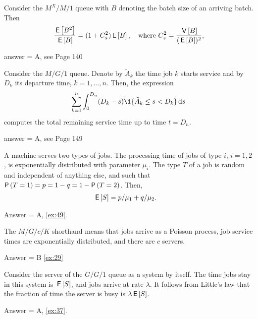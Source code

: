 \begin{exercise}[201903]
  Consider the $M^X/M/1$ queue with $B$ denoting the batch size of an arriving batch. Then
\begin{equation*}
  \frac{\,\mathsf{E}\left[B^2\right]}{\,\mathsf{E}\left[B\right]} = (1+C_s^2)\,\mathsf{E}\left[B\right], \quad\text{where }
C_s^2 = \frac{\,\mathsf{V}\left[B\right]}{(\,\mathsf{E}\left[B\right])^2},
\end{equation*}

\begin{solution}
answer = A, see Page 140
\end{solution}
\end{exercise}

\begin{exercise}[201903]
Consider the $M/G/1$ queue. Denote by $\tilde{A}_k$ the time job $k$ starts service and by $D_k$ its departure time, $k=1,\ldots,n$. Then, the expression
\begin{equation*}
\sum_{k=1}^{n} \int_0^{D_n} (D_k-s)\1{\tilde A_k \leq s < D_k} \d s
\end{equation*}
computes the total remaining service time up to time $t = D_n$.
\begin{solution}
answer = A, see Page 149
\end{solution}
\end{exercise}

\begin{exercise}[201904, 1]
  A machine serves two types of jobs.
  The processing time of jobs of type $i$, $i=1,2$, is exponentially distributed with parameter $\mu_i$.
  The type $T$ of a job is random and independent of anything else, and such that $\P{T=1} = p = 1-q = 1-\P{T=2}$. Then,
\begin{align*}
  \,\mathsf{E}\left[S\right] &= p/\mu_1 + q/\mu_2.
  \end{align*}
\begin{solution}
Answer = A, \ref{ex:49}.
\end{solution}
\end{exercise}

\begin{exercise}[201904, 1]
The  $M/G/c/K$ shorthand means that jobs arrive as a Poisson process, job service times are exponentially distributed, and there are $c$ servers.
\begin{solution} Answer = B \ref{ex:29}
\end{solution}
\end{exercise}


\begin{exercise}[201904, 1] Consider the server of the $G/G/1$ queue as a system by itself.
  The time jobs stay in this system is $\,\mathsf{E}\left[S\right]$, and jobs arrive at rate $\lambda$.
  It follows from Little's law that the fraction of time the server is busy is $\lambda \,\mathsf{E}\left[S\right]$.
\begin{solution} Answer = A, \ref{ex:37}.
\end{solution}
\end{exercise}

